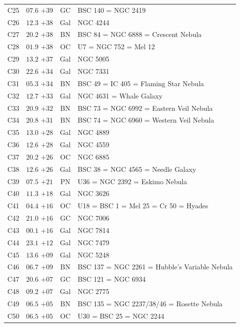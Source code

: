 \begin{table}[t]
\begin{tabularx}{\linewidth}{lccX}
C25  &$07.6$ $+39$&GC &BSC 140 = NGC 2419\\
C26  &$12.3$ $+38$&Gal&NGC 4244\\
C27  &$20.2$ $+38$&BN &BSC 84 = NGC 6888 = Crescent Nebula\\
C28  &$01.9$ $+38$&OC &U7 = NGC 752 = Mel 12\\
C29  &$13.2$ $+37$&Gal&NGC 5005\\
C30  &$22.6$ $+34$&Gal&NGC 7331\\
C31  &$05.3$ $+34$&BN &BSC 49 = IC 405 = Flaming Star Nebula\\
C32  &$12.7$ $+33$&Gal&NGC 4631 = Whale Galaxy\\
C33  &$20.9$ $+32$&BN &BSC 73 = NGC 6992 = Eastern Veil Nebula\\
C34  &$20.8$ $+31$&BN &BSC 74 = NGC 6960 = Western Veil Nebula\\
C35  &$13.0$ $+28$&Gal&NGC 4889\\
C36  &$12.6$ $+28$&Gal&NGC 4559\\
C37  &$20.2$ $+26$&OC &NGC 6885\\
C38  &$12.6$ $+26$&Gal&BSC 38 = NGC 4565 = Needle Galaxy\\
C39  &$07.5$ $+21$&PN &U36 = NGC 2392 = Eskimo Nebula\\
C40  &$11.3$ $+18$&Gal&NGC 3626\\
C41  &$04.4$ $+16$&OC &U18 = BSC 1 = Mel 25 = Cr 50 = Hyades\\
C42  &$21.0$ $+16$&GC &NGC 7006\\
C43  &$00.1$ $+16$&Gal&NGC 7814\\
C44  &$23.1$ $+12$&Gal&NGC 7479\\
C45  &$13.6$ $+09$&Gal&NGC 5248\\
C46  &$06.7$ $+09$&BN &BSC 137 = NGC 2261 = Hubble's Variable Nebula\\
C47  &$20.6$ $+07$&GC &BSC 121 = NGC 6934\\
C48  &$09.2$ $+07$&Gal&NGC 2775\\
C49  &$06.5$ $+05$&BN &BSC 135 = NGC 2237/38/46 = Rosette Nebula\\
C50  &$06.5$ $+05$&OC &U30 = BSC 25 = NGC 2244\\

        \hline
    \end{tabularx}
\end{table}
\clearpage



